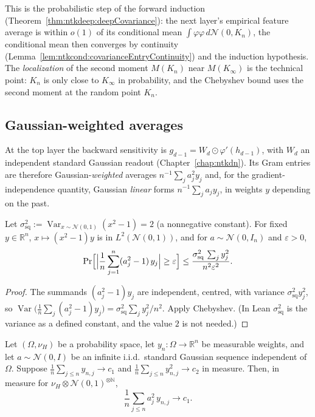 This is the probabilistic step of the forward induction (Theorem~\ref{thm:ntkdeep:deepCovariance}): the next layer's empirical feature average is within $o(1)$ of its conditional mean $\int\varphi\varphi\,d\mathcal N(0,K_n)$, the conditional mean then converges by continuity (Lemma~\ref{lem:ntkcond:covarianceEntryContinuity}) and the induction hypothesis. The \emph{localization} of the second moment $M(K_n)$ near $M(K_\infty)$ is the technical point: $K_n$ is only close to $K_\infty$ in probability, and the Chebyshev bound uses the second moment at the random point $K_n$.

\subsection{Gaussian-weighted averages}

At the top layer the backward sensitivity is $g_{d-1}=W_d\odot\varphi'(h_{d-1})$, with $W_d$ an independent standard Gaussian readout (Chapter~\ref{chap:ntkdn}). Its Gram entries are therefore Gaussian-\emph{weighted} averages $n^{-1}\sum_ja_j^2y_j$ and, for the gradient-independence quantity, Gaussian \emph{linear} forms $n^{-1}\sum_ja_jy_j$, in weights $y$ depending on the past.

\begin{lemma}\label{lem:ntkcond:centeredSquare}
  \leanok
Let $\sigma^2_{\mathrm{sq}}:=\operatorname{Var}_{x\sim\mathcal N(0,1)}(x^2-1)=2$ (a nonnegative constant). For fixed $y\in\mathbb R^n$, $x\mapsto(x^2-1)y$ is in $L^2(\mathcal N(0,1))$, and for $a\sim\mathcal N(0,I_n)$ and $\varepsilon>0$,
\[
  \Pr\Bigl[\Bigl|\frac1n\sum_{j=1}^n(a_j^2-1)\,y_j\Bigr|\ge\varepsilon\Bigr]\le\frac{\sigma_{\mathrm{sq}}^2\,\sum_jy_j^2}{n^2\varepsilon^2}.
\]
\end{lemma}

\begin{proof}
  \leanok
The summands $(a_j^2-1)y_j$ are independent, centred, with variance $\sigma_{\mathrm{sq}}^2y_j^2$, so $\operatorname{Var}\bigl(\frac1n\sum_j(a_j^2-1)y_j\bigr)=\sigma_{\mathrm{sq}}^2\sum_jy_j^2/n^2$. Apply Chebyshev. (In Lean $\sigma^2_{\mathrm{sq}}$ is the variance as a defined constant, and the value $2$ is not needed.)
\end{proof}

\begin{theorem}\label{thm:ntkcond:weightedAverage}
  \leanok
Let $(\Omega,\nu_H)$ be a probability space, let $y_n:\Omega\to\mathbb R^n$ be measurable weights, and let $a\sim\mathcal N(0,I)$ be an infinite i.i.d.\ standard Gaussian sequence independent of $\Omega$. Suppose $\frac1n\sum_{j\le n}y_{n,j}\to c_1$ and $\frac1n\sum_{j\le n}y_{n,j}^2\to c_2$ in measure. Then, in measure for $\nu_H\otimes\mathcal N(0,1)^{\otimes\mathbb N}$,
\[
  \frac1n\sum_{j\le n}a_j^2\,y_{n,j}\longrightarrow c_1 .
\]
\end{theorem}

